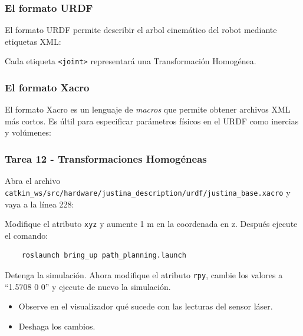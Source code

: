 \begin{frame}[containsverbatim]\frametitle{El formato URDF}
  El formato URDF permite describir el arbol cinemático del robot mediante etiquetas XML:
  \footnotesize
  
  \normalsize
  Cada etiqueta \texttt{<joint>} representará una Transformación Homogénea. 
\end{frame}

\begin{frame}[containsverbatim]\frametitle{El formato Xacro}
  El formato Xacro es un lenguaje de \textit{macros} que permite obtener archivos XML más cortos. Es últil para especificar parámetros físicos en el URDF como inercias y volúmenes:
  \footnotesize
  
\end{frame}

\begin{frame}[containsverbatim]\frametitle{Tarea 12 - Transformaciones Homogéneas}
  Abra el archivo \texttt{catkin\_ws/src/hardware/justina\_description/urdf/justina\_base.xacro} y vaya a la línea 228:
  
  Modifique el atributo \texttt{xyz} y aumente 1 m en la coordenada en z. Después ejecute el comando:
  \begin{lstlisting}
    roslaunch bring_up path_planning.launch
  \end{lstlisting}
  Detenga la simulación. Ahora modifique el atributo \texttt{rpy}, cambie los valores a ``1.5708 0 0'' y ejecute de nuevo la simulación.
  \begin{itemize}
  \item Observe en el visualizador qué sucede con las lecturas del sensor láser.
  \item Deshaga los cambios. 
  \end{itemize}
\end{frame}

